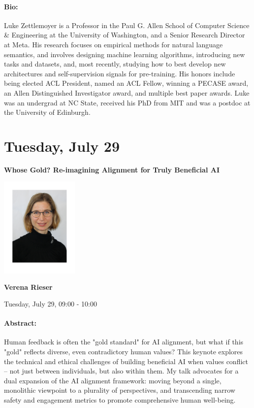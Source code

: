 \paragraph{Bio:}
Luke Zettlemoyer is a Professor in the Paul G. Allen School of Computer Science \& Engineering at the University of Washington, and a Senior Research Director at Meta. His research focuses on empirical methods for natural language semantics, and involves designing machine learning algorithms, introducing new tasks and datasets, and, most recently, studying how to best develop new architectures and self-supervision signals for pre-training. His honors include being elected ACL President, named an ACL Fellow, winning a PECASE award, an Allen Distinguished Investigator award, and multiple best paper awards. Luke was an undergrad at NC State, received his PhD from MIT and was a postdoc at the University of Edinburgh.


\clearpage


\section{Tuesday, July 29}


\begin{center}
    {\Large \textbf{Whose Gold? Re-imagining Alignment for Truly Beneficial AI}}
    
    \includegraphics[width=1.5in]{examples/acl25-handbook/invited_talks/Verena.pdf}
    
    {\large \textbf{Verena Rieser}}

    Tuesday, July 29, 09:00 - 10:00
\end{center}

\paragraph{Abstract:}
Human feedback is often the "gold standard" for AI alignment, but what if this "gold" reflects diverse, even contradictory human values? This keynote explores the technical and ethical challenges of building beneficial AI when values conflict -- not just between individuals, but also within them. My talk advocates for a dual expansion of the AI alignment framework: moving beyond a single, monolithic viewpoint to a plurality of perspectives, and transcending narrow safety and engagement metrics to promote comprehensive human well-being. 

